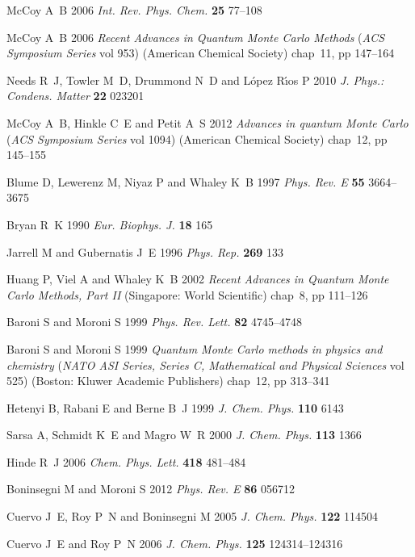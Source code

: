 \documentclass[12pt]{iopart}
\begin{document}
\begin{thebibliography}{100}
McCoy A~B 2006 {\em Int. Rev. Phys. Chem.\/} {\bf 25} 77--108

McCoy A~B 2006 {\em Recent Advances in Quantum Monte Carlo Methods\/} ({\em ACS
  Symposium Series\/} vol 953) (American Chemical Society) chap~11, pp 147--164

Needs R~J, Towler M~D, Drummond N~D and {L{\'o}pez R{\'\i}os} P 2010 {\em J.
  Phys.: Condens. Matter\/} {\bf 22} 023201

McCoy A~B, Hinkle C~E and Petit A~S 2012 {\em Advances in quantum Monte
  Carlo\/} ({\em ACS Symposium Series\/} vol 1094) (American Chemical Society)
  chap~12, pp 145--155

Blume D, Lewerenz M, Niyaz P and Whaley K~B 1997 {\em Phys. Rev. E\/} {\bf 55}
  3664--3675

Bryan R~K 1990 {\em Eur. Biophys. J.\/} {\bf 18} 165

Jarrell M and Gubernatis J~E 1996 {\em Phys. Rep.\/} {\bf 269} 133

Huang P, Viel A and Whaley K~B 2002 {\em Recent Advances in Quantum Monte Carlo
  Methods, Part II\/} (Singapore: World Scientific) chap~8, pp 111--126

Baroni S and Moroni S 1999 {\em Phys. Rev. Lett.\/} {\bf 82} 4745--4748

Baroni S and Moroni S 1999 {\em Quantum Monte Carlo methods in physics and
  chemistry\/} ({\em NATO ASI Series, Series C, Mathematical and Physical
  Sciences\/} vol 525) (Boston: Kluwer Academic Publishers) chap~12, pp
  313--341

Hetenyi B, Rabani E and Berne B~J 1999 {\em J. Chem. Phys.\/} {\bf 110} 6143

Sarsa A, Schmidt K~E and Magro W~R 2000 {\em J. Chem. Phys.\/} {\bf 113} 1366

Hinde R~J 2006 {\em Chem. Phys. Lett.\/} {\bf 418} 481--484

Boninsegni M and Moroni S 2012 {\em Phys. Rev. E\/} {\bf 86} 056712

Cuervo J~E, Roy P~N and Boninsegni M 2005 {\em J. Chem. Phys.\/} {\bf 122}
  114504

Cuervo J~E and Roy P~N 2006 {\em J. Chem. Phys.\/} {\bf 125} 124314--124316


\end{thebibliography}
\end{document}
